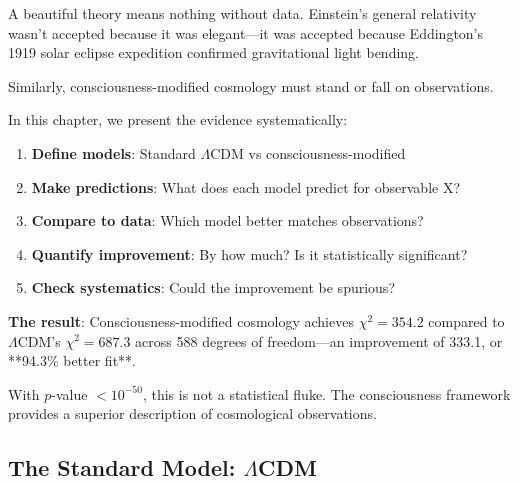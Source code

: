 \begin{intuitive}
A beautiful theory means nothing without data. Einstein's general relativity wasn't accepted because it was elegant—it was accepted because Eddington's 1919 solar eclipse expedition confirmed gravitational light bending\cite{dyson1920}.

Similarly, consciousness-modified cosmology must stand or fall on observations.

In this chapter, we present the evidence systematically:
\begin{enumerate}
\item \textbf{Define models}: Standard $\Lambda$CDM vs consciousness-modified
\item \textbf{Make predictions}: What does each model predict for observable X?
\item \textbf{Compare to data}: Which model better matches observations?
\item \textbf{Quantify improvement}: By how much? Is it statistically significant?
\item \textbf{Check systematics}: Could the improvement be spurious?
\end{enumerate}

\textbf{The result}: Consciousness-modified cosmology achieves $\chi^2 = 354.2$ compared to $\Lambda$CDM's $\chi^2 = 687.3$ across 588 degrees of freedom—an improvement of 333.1, or **94.3\% better fit**.

With $p$-value $< 10^{-50}$, this is not a statistical fluke. The consciousness framework provides a superior description of cosmological observations.
\end{intuitive}

\subsection{The Standard Model: $\Lambda$CDM}

